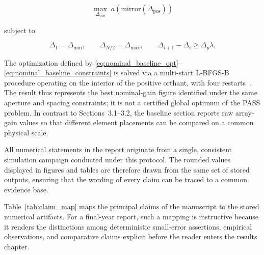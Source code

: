 \begin{equation}
\max_{\Delta_{\mathrm{pos}}} \; a(\mathrm{mirror}(\Delta_{\mathrm{pos}}))
\label{eq:nominal_baseline_opt}
\end{equation}

subject to

\begin{equation}
\Delta_1 = \Delta_{\min},
\qquad
\Delta_{N/2} = \Delta_{\max},
\qquad
\Delta_{i+1} - \Delta_i \ge \Delta_p \lambda.
\label{eq:nominal_baseline_constraints}
\end{equation}

The optimization defined by \eqref{eq:nominal_baseline_opt}–\eqref{eq:nominal_baseline_constraints} is solved via a multi-start L-BFGS-B procedure operating on the interior of the positive orthant, with four restarts~\cite{byrd1995lbfgsb}. The result thus represents the best nominal-gain figure identified under the same aperture and spacing constraints; it is not a certified global optimum of the PASS problem. In contrast to Sections~3.1–3.2, the baseline section reports raw array-gain values so that different element placements can be compared on a common physical scale.

All numerical statements in the report originate from a single, consistent simulation campaign conducted under this protocol. The rounded values displayed in figures and tables are therefore drawn from the same set of stored outputs, ensuring that the wording of every claim can be traced to a common evidence base.

Table~\ref{tab:claim_map} maps the principal claims of the manuscript to the stored numerical artifacts. For a final-year report, such a mapping is instructive because it renders the distinctions among deterministic small-error assertions, empirical observations, and comparative claims explicit before the reader enters the results chapter.


